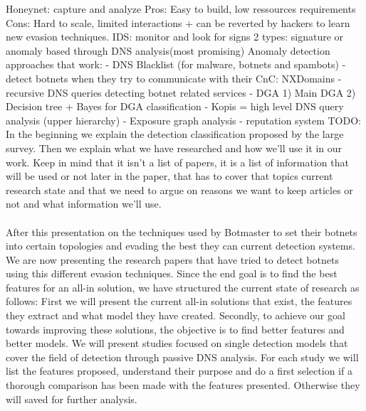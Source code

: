 
\cite{bot-ml}
Honeynet: capture and analyze Pros: Easy to build, low ressources requirements Cons: Hard to
scale, limited interactions + can be reverted by hackers to learn new evasion techniques.
IDS: monitor and look for signs 2 types: signature or anomaly based through DNS analysis(most
promising) \cite{detection10}
\cite{survey11}
Anomaly detection approaches that work: 
- DNS Blacklist (for malware, botnets and spambots) 
\cite{dnsbl} 
- detect botnets when they try to communicate with their CnC:
NXDomains 
\cite{detection11}
- recursive DNS queries detecting botnet related services \cite{detection12}
- DGA 
1) Main DGA \cite{dga2}
2) Decision tree + Bayes for DGA classification 
\cite{detection13} 
- Kopis = high level DNS query analysis (upper hierarchy)
\cite{detection14}
- Exposure 
\cite{passive-dns}
graph analysis 
\cite{dns-fail}
- reputation system 
\cite{reputation} 
TODO: In the beginning we explain the detection classification proposed by the large survey. Then we explain what we have researched and how we'll use it in our work. Keep in mind that it isn't a list of papers, it is a list of information that will be used or not later in the paper, that has to cover that topics current research state and that we need to argue on reasons we want to keep articles or not and what information we'll use.
\\\\
After this presentation on the techniques used by Botmaster to set their botnets into certain topologies and evading the best they can current detection systems. We are now presenting the research papers that have tried to detect botnets using this different evasion techniques. Since the end goal is to find the best features for an all-in solution, we have structured the current state of research as follows: 
First we will present the current all-in solutions that exist, the features they extract and what model they have created. 
Secondly, to achieve our goal towards improving these solutions, the objective is to find better features and better models. We will present studies focused on single detection models that cover the field of detection through passive DNS analysis. For each study we will list the features proposed, understand their purpose and do a first selection if a thorough comparison has been made with the features presented. Otherwise they will saved for further analysis.
\\\\
